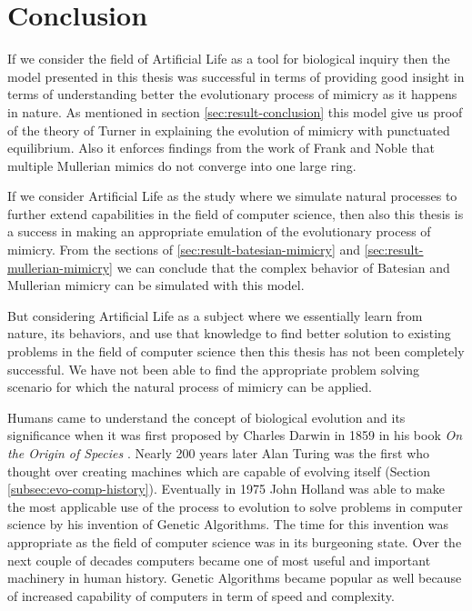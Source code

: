 \chapter{Conclusion}
\label{chapter:conclusion}
If we consider the field of Artificial Life as a tool for biological inquiry then the model presented in this thesis was successful in terms of providing good insight in terms of understanding better the evolutionary process of mimicry as it happens in nature. As mentioned in section \ref{sec:result-conclusion} this model give us proof of the theory of Turner in explaining the evolution of mimicry with punctuated equilibrium. Also it enforces findings from the work of Frank and Noble that multiple Mullerian mimics do not converge into one large ring.

If we consider Artificial Life as the study where we simulate natural processes to further extend capabilities in the field of computer science, then also this thesis is a success in making an appropriate emulation of the evolutionary process of mimicry. From the sections of \ref{sec:result-batesian-mimicry} and \ref{sec:result-mullerian-mimicry} we can conclude that the complex behavior of Batesian and Mullerian mimicry can be simulated with this model.

But considering Artificial Life as a subject where we essentially learn from nature, its behaviors, and use that knowledge to find better solution to existing problems in the field of computer science then this thesis has not been completely successful. We have not been able to find the appropriate problem solving scenario for which the natural process of mimicry can be applied.

Humans came to understand the concept of biological evolution and its significance when it was first proposed by Charles Darwin in 1859 in his book \textsl{On the Origin of Species} \cite{darwin1859}. Nearly 200 years later Alan Turing was the first who thought over creating machines which are capable of evolving itself (Section \ref{subsec:evo-comp-history}). Eventually in 1975 John Holland was able to make the most applicable use of the process to evolution to solve problems in computer science by his invention of Genetic Algorithms. The time for this invention was appropriate as the field of computer science was in its burgeoning state. Over the next couple of decades computers became one of most useful and important machinery in human history. Genetic Algorithms became popular as well because of increased capability of computers in term of speed and complexity.  

